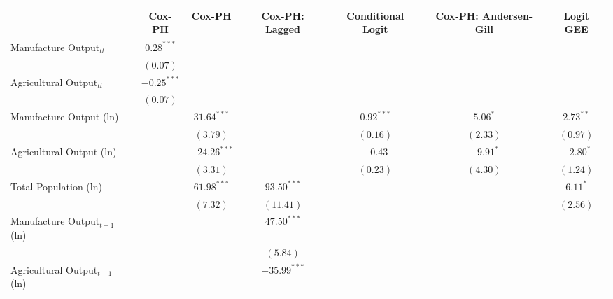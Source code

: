 \documentclass[onesided]{article}\usepackage[]{graphicx}\usepackage[]{color}
\begin{document}
\begin{table}[h]
\begin{center}
\begin{scriptsize}
\begin{tabular}{l c c c c c c }
\hline
 & Cox-PH & Cox-PH & Cox-PH: Lagged & Conditional Logit & Cox-PH: Andersen-Gill & Logit GEE \\
\hline
Manufacture Output$_{tt}$         & $0.28^{***}$  &                &                &              &             &               \\
                                  & $(0.07)$      &                &                &              &             &               \\
Agricultural Output$_{tt}$        & $-0.25^{***}$ &                &                &              &             &               \\
                                  & $(0.07)$      &                &                &              &             &               \\
Manufacture Output  (ln)          &               & $31.64^{***}$  &                & $0.92^{***}$ & $5.06^{*}$  & $2.73^{**}$   \\
                                  &               & $(3.79)$       &                & $(0.16)$     & $(2.33)$    & $(0.97)$      \\
Agricultural Output (ln)          &               & $-24.26^{***}$ &                & $-0.43$      & $-9.91^{*}$ & $-2.80^{*}$   \\
                                  &               & $(3.31)$       &                & $(0.23)$     & $(4.30)$    & $(1.24)$      \\
Total Population  (ln)            &               & $61.98^{***}$  & $93.50^{***}$  &              &             & $6.11^{*}$    \\
                                  &               & $(7.32)$       & $(11.41)$      &              &             & $(2.56)$      \\
Manufacture Output$_{t-1}$  (ln)  &               &                & $47.50^{***}$  &              &             &               \\
                                  &               &                & $(5.84)$       &              &             &               \\
Agricultural Output$_{t-1}$  (ln) &               &                & $-35.99^{***}$ &              &             &               \\

\end{tabular}
\end{scriptsize}
\end{center}
\end{table}
\end{document}
